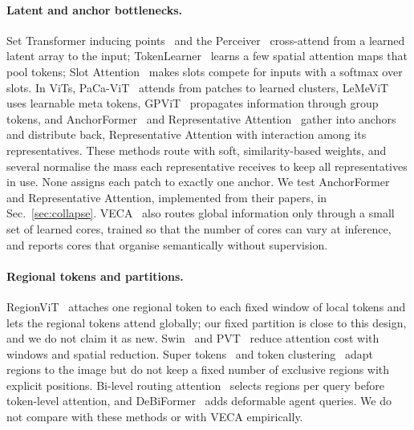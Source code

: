 \documentclass[runningheads]{llncs}
\begin{document}
\paragraph{Latent and anchor bottlenecks.}
Set Transformer inducing points~\cite{lee2019settransformer} and the
Perceiver~\cite{jaegle2021perceiver} cross-attend from a learned latent array to the input;
TokenLearner~\cite{ryoo2021tokenlearner} learns a few spatial attention maps that pool tokens;
Slot Attention~\cite{locatello2020slot} makes slots compete for inputs with a softmax over
slots. In ViTs, PaCa-ViT~\cite{grainger2023paca} attends from patches to learned clusters,
LeMeViT~\cite{jiang2024lemevit} uses learnable meta tokens, GPViT~\cite{yang2023gpvit}
propagates information through group tokens, and AnchorFormer~\cite{anchorformer2025} and
Representative Attention~\cite{representative2026} gather into anchors and distribute back,
Representative Attention with interaction among its representatives. These methods route with
soft, similarity-based weights, and several normalise the mass each representative receives to
keep all representatives in use. None assigns each patch to exactly one anchor. We test
AnchorFormer and Representative Attention, implemented from their papers, in
Sec.~\ref{sec:collapse}. VECA~\cite{song2026veca} also routes global information only through a
small set of learned cores, trained so that the number of cores can vary at inference, and
reports cores that organise semantically without supervision.

\paragraph{Regional tokens and partitions.}
RegionViT~\cite{chen2022regionvit} attaches one regional token to each fixed window of local
tokens and lets the regional tokens attend globally; our fixed partition is close to this design,
and we do not claim it as new. Swin~\cite{liu2021swin} and PVT~\cite{wang2022pvtv2} reduce
attention cost with windows and spatial reduction. Super tokens~\cite{huang2023supertoken} and
token clustering~\cite{zeng2022tcformer,zeng2024tcformer} adapt regions to the image but do not
keep a fixed number of exclusive regions with explicit positions. Bi-level routing
attention~\cite{zhu2023biformer} selects regions per query before token-level attention, and
DeBiFormer~\cite{baolong2024debiformer} adds deformable agent queries. We do not compare with
these methods or with VECA empirically.
\end{document}

